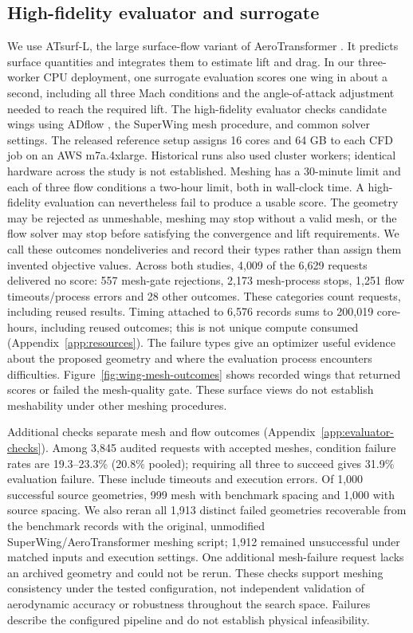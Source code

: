 \documentclass{article} %
\newcommand{\CoreHoursOverall}{200{,}019}
\newcommand{\TimedEvaluationsOverall}{6{,}576}
\begin{document}
\subsection{High-fidelity evaluator and surrogate}

We use ATsurf-L, the large surface-flow variant of AeroTransformer \citep{yang2026aerotransformer}.
It predicts surface quantities and integrates them to estimate lift and drag.
In our three-worker CPU deployment, one surrogate evaluation scores one wing in
about a second, including all three Mach conditions and the angle-of-attack
adjustment needed to reach the required lift.
The high-fidelity evaluator checks candidate wings using ADflow
\citep{mader2020adflow}, the SuperWing mesh procedure, and common solver settings.
The released reference setup assigns 16 cores and 64 GB to each CFD job on an
AWS m7a.4xlarge. Historical runs also used cluster workers; identical hardware
across the study is not established.
Meshing has a 30-minute limit and each of three flow conditions a two-hour
limit, both in wall-clock time.
A high-fidelity evaluation can nevertheless fail to produce a usable score.
The geometry may be rejected as unmeshable, meshing may stop without a valid
mesh, or the flow solver may stop before satisfying the convergence and
lift requirements. We call these outcomes nondeliveries and record their types
rather than assign them invented objective values. Across both studies, 4{,}009
of the 6{,}629 requests delivered no score: 557 mesh-gate rejections,
2{,}173 mesh-process stops, 1{,}251 flow timeouts/process errors and 28 other
outcomes. These categories count requests, including reused results.
Timing attached to \TimedEvaluationsOverall{} records sums to
\CoreHoursOverall{} core-hours, including reused outcomes; this is not
unique compute consumed (Appendix~\ref{app:resources}). The failure types give an
optimizer useful evidence about the proposed geometry and where the evaluation
process encounters difficulties. Figure~\ref{fig:wing-mesh-outcomes} shows
recorded wings that returned scores or failed the mesh-quality gate. These
surface views do not establish meshability under other meshing procedures.

Additional checks separate mesh and flow outcomes
(Appendix~\ref{app:evaluator-checks}). Among 3{,}845 audited requests with
accepted meshes, condition failure rates are 19.3--23.3\% (20.8\% pooled);
requiring all three to succeed gives 31.9\% evaluation failure. These include
timeouts and execution errors. Of 1{,}000 successful source geometries,
999 mesh with benchmark spacing and 1{,}000 with source spacing. We also reran
all 1{,}913 distinct failed geometries recoverable from the benchmark records
with the original, unmodified SuperWing/AeroTransformer meshing script;
1{,}912 remained unsuccessful under matched inputs and execution settings.
One additional mesh-failure request lacks an archived geometry and could not
be rerun. These checks support meshing consistency under the tested
configuration, not independent validation of aerodynamic accuracy or
robustness throughout the search space. Failures describe the configured
pipeline and do not establish physical infeasibility.
\end{document}
